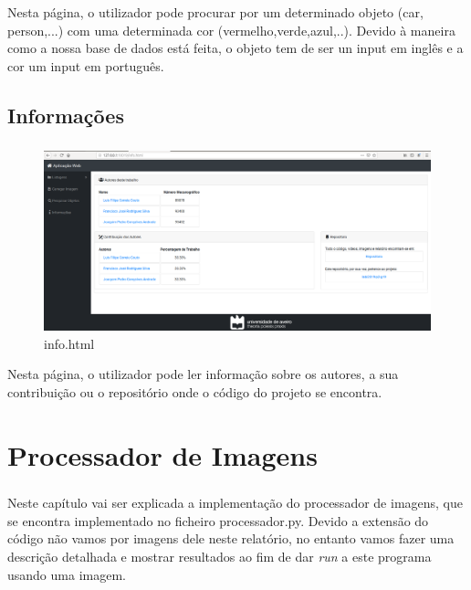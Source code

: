 \documentclass{report}
\begin{document}
Nesta página, o utilizador pode procurar por um determinado objeto (car, person,...) com uma determinada cor (vermelho,verde,azul,..). Devido à maneira como a nossa base de dados está feita, o objeto tem de ser un input em inglês e a cor um input em português.



\section{Informações}
\paragraph{}

\begin{figure}[H]
\centering
\includegraphics[width=1\linewidth]{info.png}
\caption{info.html}
\end{figure}

Nesta página, o utilizador pode ler informação sobre os autores, a sua contribuição ou o repositório onde o código do projeto se encontra.




\chapter{Processador de Imagens}
\label{chap.processador}
\paragraph{}
Neste capítulo vai ser explicada a implementação do processador de imagens, que se encontra implementado no ficheiro processador.py.
Devido a extensão do código não vamos por imagens dele neste relatório, no entanto vamos fazer uma descrição detalhada e mostrar resultados ao fim de dar \textit{run} a este programa usando uma imagem.
\end{document}
